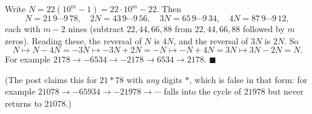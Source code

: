 Write $N=22(10^m-1)=22\cdot10^m-22$. Then
\[N=21\,9\cdots9\,78,\quad2N=43\,9\cdots9\,56,\quad3N=65\,9\cdots9\,34,\quad4N=87\,9\cdots9\,12,\]
each with $m-2$ nines (subtract $22,44,66,88$ from $22,44,66,88$ followed by $m$ zeros). Reading these, the reversal of $N$ is $4N$, and the reversal of $3N$ is $2N$. So
\[N\mapsto N-4N=-3N\mapsto-3N+2N=-N\mapsto-N+4N=3N\mapsto3N-2N=N.\]
For example $2178\to-6534\to-2178\to6534\to2178$. $\blacksquare$

(The post claims this for $21\ast78$ with \emph{any} digits $\ast$, which is false in that form: for example $21078\to-65934\to-21978\to\cdots$ falls into the cycle of $21978$ but never returns to $21078$.)
